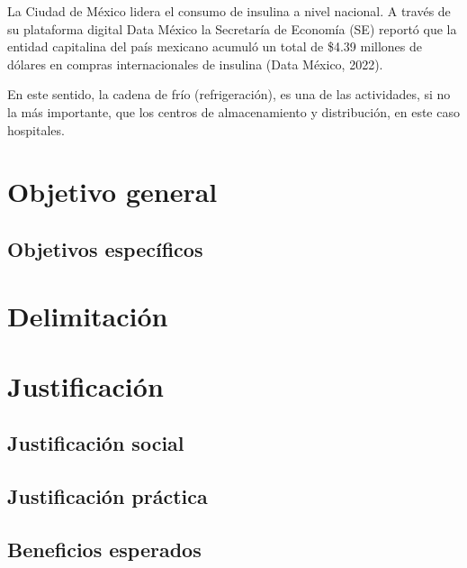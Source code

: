 La Ciudad de México lidera el consumo de insulina a nivel nacional. A través de su plataforma digital Data México la Secretaría de Economía (SE) reportó que la entidad capitalina del país mexicano acumuló un total de \$4.39 millones de dólares en compras internacionales de insulina (Data México, 2022).

En este sentido, la cadena de frío (refrigeración), es una de las actividades, si no la más importante, que los centros de almacenamiento y distribución, en este caso hospitales.




\chapter*{Objetivo general}


\section*{Objetivos específicos}

\newpage
\chapter*{Delimitación}
\newpage
\chapter*{Justificación}

\section*{Justificación social}

\newpage
\section*{Justificación práctica}


\newpage
\section*{Beneficios esperados}




 
